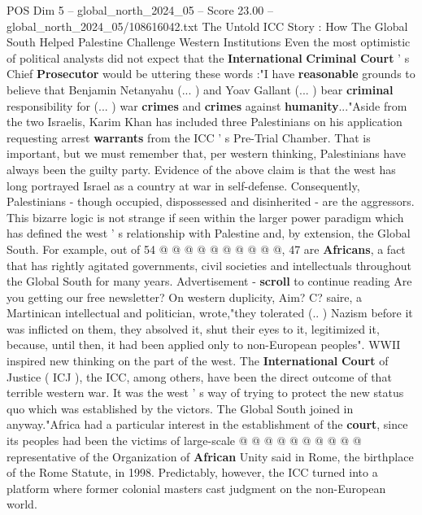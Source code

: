 \begin{textsample}{POS Dim 5 – global\_north\_2024\_05 – Score 23.00 – global\_north\_2024\_05/108616042.txt}  \label{ex:f5_pos_161}
The Untold ICC Story : How The Global South Helped Palestine Challenge Western Institutions Even the most optimistic of political analysts did not expect that the \textbf{International} \textbf{Criminal} \textbf{Court} ' s Chief \textbf{Prosecutor} would be uttering these words :"I have \textbf{reasonable} grounds to believe that Benjamin Netanyahu (... ) and Yoav Gallant (... ) bear \textbf{criminal} responsibility for (... ) war \textbf{crimes} and \textbf{crimes} against \textbf{humanity}..."Aside from the two Israelis, Karim Khan has included three Palestinians on his application requesting arrest \textbf{warrants} from the ICC ' s Pre-Trial Chamber.
That is important, but we must remember that, per western thinking, Palestinians have always been the guilty party.
Evidence of the above claim is that the west has long portrayed Israel as a country at war in self-defense.
Consequently, Palestinians - though occupied, dispossessed and disinherited - are the aggressors.
This bizarre logic is not strange if seen within the larger power paradigm which has defined the west ' s relationship with Palestine and, by extension, the Global South.
For example, out of 54 @ @ @ @ @ @ @ @ @ @, 47 are \textbf{Africans}, a fact that has rightly agitated governments, civil societies and intellectuals throughout the Global South for many years.
Advertisement - \textbf{scroll} to continue reading Are you getting our free newsletter?
On western duplicity, Aim?
C? saire, a Martinican intellectual and politician, wrote,"they tolerated (.. ) Nazism before it was inflicted on them, they absolved it, shut their eyes to it, legitimized it, because, until then, it had been applied only to non-European peoples".
WWII inspired new thinking on the part of the west.
The \textbf{International} \textbf{Court} of Justice ( ICJ ), the ICC, among others, have been the direct outcome of that terrible western war.
It was the west ' s way of trying to protect the new status quo which was established by the victors.
The Global South joined in anyway."Africa had a particular interest in the establishment of the \textbf{court}, since its peoples had been the victims of large-scale @ @ @ @ @ @ @ @ @ @ representative of the Organization of \textbf{African} Unity said in Rome, the birthplace of the Rome Statute, in 1998.
Predictably, however, the ICC turned into a platform where former colonial masters cast judgment on the non-European world.

\end{textsample}
